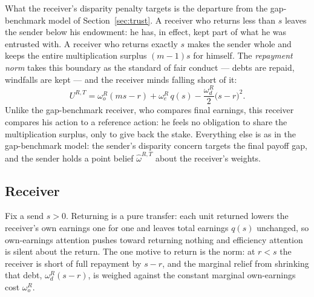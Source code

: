 \documentclass[11pt]{article}
\theoremstyle{plain}
\theoremstyle{remark}
\begin{document}
What the receiver's disparity penalty targets is the departure from the gap-benchmark model of Section~\ref{sec:trust}.  A receiver who returns less than $s$ leaves the sender below his endowment: he has, in effect, kept part of what he was entrusted with.  A receiver who returns exactly $s$ makes the sender whole and keeps the entire multiplication surplus $(m-1)s$ for himself.  The \emph{repayment norm} takes this boundary as the standard of fair conduct --- debts are repaid, windfalls are kept --- and the receiver minds falling short of it:
\begin{equation}
\label{eq:norm2_utility}
        U^{R,T}
        =
        \omega_o^{R}(ms-r)
        +\omega_e^{R}\,q(s)
        -\frac{\omega_d^{R}}{2}\big(s-r\big)^{2}.
\end{equation}
Unlike the gap-benchmark receiver, who compares final earnings, this receiver compares his action to a reference action: he feels no obligation to share the multiplication surplus, only to give back the stake.  Everything else is as in the gap-benchmark model: the sender's disparity concern targets the final payoff gap, and the sender holds a point belief $\hat\omega^{R,T}$ about the receiver's weights.

\subsection{Receiver}

Fix a send $s>0$.  Returning is a pure transfer: each unit returned lowers the receiver's own earnings one for one and leaves total earnings $q(s)$ unchanged, so own-earnings attention pushes toward returning nothing and efficiency attention is silent about the return.  The one motive to return is the norm: at $r<s$ the receiver is short of full repayment by $s-r$, and the marginal relief from shrinking that debt, $\omega_d^{R}(s-r)$, is weighed against the constant marginal own-earnings cost $\omega_o^{R}$.
\end{document}
